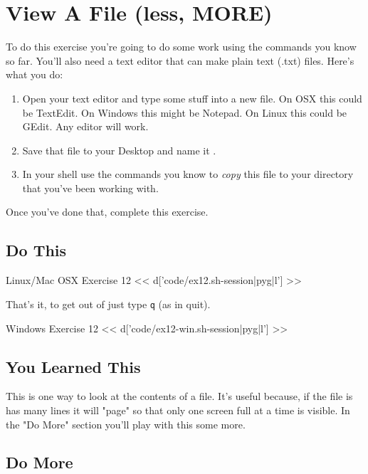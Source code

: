 \chapter{View A File (less, MORE)}

To do this exercise you're going to do some work using the commands you know so far.
You'll also need a text editor that can make plain text (.txt) files.  Here's
what you do:

\begin{enumerate}
\item Open your text editor and type some stuff into a new file. On OSX this could be TextEdit.  On Windows this might be Notepad.  On Linux this could be GEdit.  Any editor will work.
\item Save that file to your Desktop and name it .
\item In your shell use the commands you know to \emph{copy} this file
    to your  directory that you've been working with.
\end{enumerate}

Once you've done that, complete this exercise.

\section{Do This}

\begin{code}{Linux/Mac OSX Exercise 12}
<< d['code/ex12.sh-session|pyg|l'] >>
\end{code}

That's it, to get out of  just type \verb|q| (as in quit).

\begin{code}{Windows Exercise 12}
<< d['code/ex12-win.sh-session|pyg|l'] >>
\end{code}

\section{You Learned This}

This is one way to look at the contents of a file.  It's useful because, if the
file is has many lines it will "page" so that only one screen full at a time
is visible.  In the "Do More" section you'll play with this some more.


\section{Do More}

